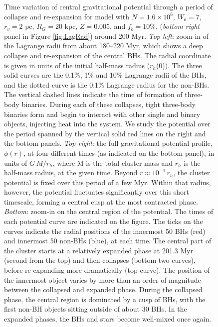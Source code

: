 \documentclass[12pt,preprint]{aastex}
\begin{document}
\begin{figure}[!h]
	\caption{Time variation of central gravitational potential through a period of collapse and re-expansion 
	for model with $N=1.6 \times 10^6$, $W_o=7$, $r_v=2$ pc, $R_G=20$ kpc, $Z=0.005$, and $f_b=10$\%, 
	(\emph{bottom right} panel in Figure \ref{fig:LagRad}) around 200 Myr. \emph{Top left}: zoom in of the 
	Lagrange radii from about 180--220 Myr, which shows a deep collapse and re-expansion of the central BHs.
	The radial coordinate is given in units of the initial half-mass radius ($r_h$(0)). The 
	three solid curves are the 0.1\%, 1\% and 10\% Lagrange radii of the BHs, and the dotted curve is the 0.1\%
	Lagrange radius for the non-BHs. The vertical dashed lines indicate the time of formation
	of three-body binaries. During each of these collapses, tight three-body binaries form and begin
	to interact with other single and binary objects, injecting heat into the system. We study the potential
	over the period spanned by the vertical solid red lines on the right and the bottom panels.
	\emph{Top right}: the full gravitational potential profile, $\phi(r)$, at four different times 
	(as indicated on the bottom panel), in units of $G\, M / r_h$, where M is the
	total cluster mass and $r_h$ is the half-mass radius, at the given time. Beyond $r\approx10^{-1}\,r_h$,
	the cluster potential is fixed over this period of a few Myr. Within that radius, however, the potential
	fluctuates significantly over this short timescale, forming a central cusp at the most contracted phase.
	\emph{Bottom}: zoom-in on the central region of the potential. The times of each potential curve are 
	indicated on the figure. The ticks on the curves indicate the radial positions of the innermost 50 BHs
	(red) and innermost 50 non-BHs (blue), at each time. The central part of the cluster starts at a 
	relatively expanded phase at 201.3 Myr (second from the top) and then collapses 
	(bottom two curves), before re-expanding more dramatically (top curve). The position of the innermost
	object varies by more than an order of magnitude between the collapsed and expanded 
	phase. During the collapsed phase, the central region is dominated by a cusp of BHs, with 
	the first non-BH objects sitting outside of about 30 BHs. In the expanded phases, 
	the BHs and stars become well-mixed once again.
	}
	\label{fig:potential}
\end{figure}

\end{document}
